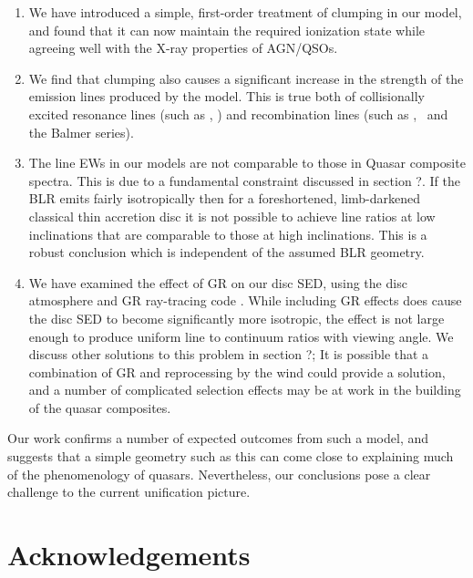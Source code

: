\documentclass[useAMS,usenatbib]{mn2e_x}
\begin{document}
\begin{enumerate}
\item We have introduced a simple, first-order treatment 
of clumping in our model, and found that it can now maintain
the required ionization state while agreeing well with the X-ray
properties of AGN/QSOs.
\smallskip
\item We find that clumping also causes a significant 
increase in the strength of the  emission
lines produced by the model. This is true both
of collisionally excited resonance lines (such as \civ, \nv)
and recombination lines (such as \la, \ha\ and the Balmer series).
\smallskip
\item The line EWs in our models are not comparable to those in Quasar composite
spectra. This is due to a fundamental constraint discussed in section ?. If the BLR
emits fairly isotropically then for a foreshortened, limb-darkened classical thin accretion disc
it is not possible to achieve line ratios at low inclinations that are comparable to
those at high inclinations. This is a robust conclusion which 
is independent of the assumed BLR geometry. 
\smallskip
\item We have examined the effect of GR on our disc SED, using the disc atmosphere
and GR ray-tracing code \agn. While including GR effects
does cause the disc SED to become significantly more isotropic,
the effect is not large enough to produce uniform line to continuum ratios
with viewing angle. We discuss other solutions to this problem in section ?; 
It is possible that a combination of GR and reprocessing by the wind could provide a 
solution, and a number of complicated selection effects may be at work
in the building of the quasar composites.
\end{enumerate}

Our work confirms a number of expected outcomes from such a model, and suggests 
that a simple geometry such as this can come close to explaining much of the 
phenomenology of quasars. Nevertheless, our conclusions pose a clear challenge 
to the current unification picture.


\section*{Acknowledgements}




\newpage
\end{document}
